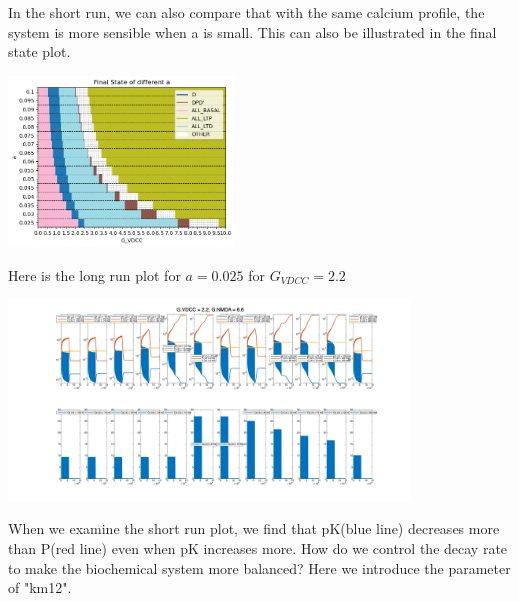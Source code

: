 \documentclass{article}
\begin{document}
\vspace{0.5cm} %
In the short run, we can also compare that with the same calcium profile, the system is more sensible when a is small. This can also be illustrated in the final state plot.\\
\begin{minipage}{\textwidth} %
    \centering
    \includegraphics[width=0.45\textwidth]{a_final_state.png} %
    \label{fig:a0.25}
\end{minipage}
Here is the long run plot for $a=0.025$ for $G_{VDCC}=2.2$\\
\begin{minipage}{\textwidth} %
    \centering
    \includegraphics[width=0.8\textwidth]{a=0.025_long run G_VDCC=2.20_G_NMDA=6.60.png} %
    \label{fig:a0.25}
\end{minipage}
 When we examine the short run plot, we find that pK(blue line) decreases more than P(red line) even when pK increases more. How do we control the decay rate to make the biochemical system more balanced? Here we introduce the parameter of "km12".
\end{document}
